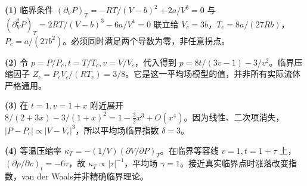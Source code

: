 \par\noindent\textbf{(1)} 临界条件 \((\partial_VP)_T=-RT/(V-b)^2+2a/V^3=0\) 与 \((\partial_V^2P)_T=2RT/(V-b)^3-6a/V^4=0\) 联立给 \(V_c=3b\)，\(T_c=8a/(27Rb)\)，\(P_c=a/(27b^2)\)。必须同时满足两个导数为零，非任意拐点。
\par\noindent\textbf{(2)} 令 \(p=P/P_c,t=T/T_c,v=V/V_c\)，代入得到 \(p=8t/(3v-1)-3/v^2\)。临界压缩因子 \(Z_c=P_cV_c/(RT_c)=3/8\)。它是这一平均场模型的值，并非所有实际流体严格通用。
\par\noindent\textbf{(3)} 在 \(t=1,v=1+x\) 附近展开 \(8/(2+3x)-3/(1+x)^2=1-\tfrac32x^3+O(x^4)\)。因为线性、二次项消失，\(|P-P_c|\propto|V-V_c|^3\)，所以平均场临界指数 \(\delta=3\)。
\par\noindent\textbf{(4)} 等温压缩率 \(\kappa_T=-(1/V)(\partial V/\partial P)_T\)。在临界等容线 \(v=1,t=1+\tau\) 上，\((\partial p/\partial v)_t=-6\tau\)，故 \(\kappa_T\propto|\tau|^{-1}\)，平均场 \(\gamma=1\)。接近真实临界点时涨落改变指数，van der Waals并非精确临界理论。
